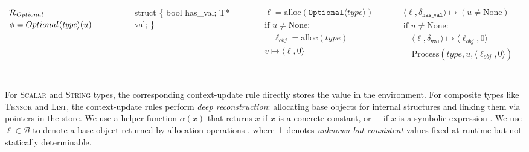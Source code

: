 \documentclass[manuscript,screen,review]{acmart}
\theoremstyle{indenteditalic}
\providecommand{\DIFaddtex}[1]{{\protect\color{blue}#1}} %
\providecommand{\DIFidentity}[1]{#1}
\providecommand{\DIFdeltex}[1]{{%
  \protect\color{red}%
  \normalfont\normalsize
  \let\textbf\DIFidentity
  \let\textit\DIFidentity
  \let\texttt\DIFidentity
  \let\textsc\DIFidentity
  \let\textsf\DIFidentity
  \let\emph\DIFidentity
  \let\uline\DIFidentity
  \sout{#1}%
}} %
\providecommand{\DIFaddbegin}{} %
\providecommand{\DIFaddend}{} %
\providecommand{\DIFdelbegin}{} %
\providecommand{\DIFdelend}{} %
\providecommand{\DIFadd}[1]{\texorpdfstring{\DIFaddtex{#1}}{#1}} %
\providecommand{\DIFdel}[1]{\texorpdfstring{\DIFdeltex{#1}}{}} %
\begin{document}
\begin{table}[htbp]
\begin{tabular}{m{}|m{}|>{\raggedright\arraybackslash}m{}|>{\raggedright\arraybackslash}m{}}
    $\mathcal{R}_{\textsc{Optional}}$ \newline $\phi=\textsc{Optional}\langle\mathit{type}\rangle(u)$ &
    {\ttfamily struct \{ \newline \hspace*{0.8em} bool has\_val; \newline \hspace*{0.8em} T* val; \newline \}} &
\mbox{%
$\begin{aligned}
      & \ell = \text{alloc}(\texttt{Optional}\langle\mathit{type}\rangle) \\
      & \text{if } u \neq \text{None}: \\
      & \quad \ell_{obj} = \text{alloc}(\mathit{type}) \\
      & v \mapsto \langle\ell, 0\rangle
    \end{aligned}$
}%
&
\mbox{%
$\begin{aligned}
      & \langle \ell, \delta_{\texttt{has\_val}} \rangle \mapsto (u \neq \text{None}) \\
      & \text{if } u \neq \text{None}: \\
      & \quad \langle \ell, \delta_{\texttt{val}} \rangle \mapsto \langle\ell_{obj}, 0\rangle \\
      & \quad \text{Process}(\mathit{type}, u, \langle \ell_{obj}, 0 \rangle)
    \end{aligned}$
}%
\\
    \thickhline
  \end{tabular}
\end{table}


\DIFaddend For \textsc{Scalar} \DIFaddbegin \DIFadd{and }\textsc{\DIFadd{String}} \DIFaddend types, the \DIFaddbegin \DIFadd{corresponding context-update }\DIFaddend rule directly stores the value in the environment.
For composite types like \textsc{Tensor} and \textsc{List}, the \DIFaddbegin \DIFadd{context-update }\DIFaddend rules perform \textit{deep reconstruction}: allocating base objects for internal structures and linking them via pointers in the store.
We use a helper function $\alpha(x)$ that returns $x$ if $x$ is a concrete constant, or $\bot$ if $x$ is a symbolic expression\DIFdelbegin \DIFdel{.
We use $\ell \in \mathcal{B}$ to denote a base object returned by allocation operations}\DIFdelend \DIFaddbegin \DIFadd{, where $\bot$ denotes }\textit{\DIFadd{unknown-but-consistent}} \DIFadd{values fixed at runtime but not statically determinable}\DIFaddend .
\end{document}
